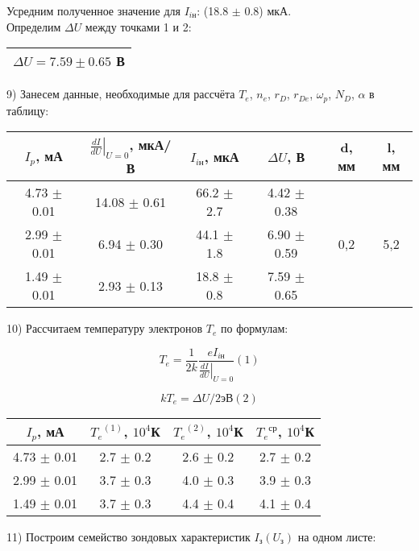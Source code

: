 \documentclass[a4paper,12pt]{article}
\begin{document}
Усредним полученное значение для $I_{i\text{н}}$: (18.8 $\pm$ 0.8) мкА. \\

Определим $\Delta U$ между точками 1 и 2: \begin{tabular}{|c|} \hline $\Delta U = 7.59 \pm 0.65$ В\\ \hline \end{tabular}

\par9) Занесем данные, необходимые для рассчёта $T_e$, $n_e$, $r_D$, $r_{De}$, ${\omega}_p$, $N_D$, $\alpha$ в таблицу:\\

\begin{center}
\begin{tabular}{|c|c|c|c|c|c|}
	\hline
	$I_p$, мА & $\left.\frac{dI}{dU}\right|_{U=0}$, мкА/В & $I_{i\text{н}}$, мкА & $\Delta U$, В & d, мм & l, мм\\
	\hline
	4.73 $\pm$ 0.01 & 14.08 $\pm$ 0.61 & 66.2 $\pm$ 2.7 & 4.42 $\pm$ 0.38  & \multirow{3}{*}{0,2} & \multirow{3}{*}{5,2}\\
	\cline{1-4}
	2.99 $\pm$ 0.01 & 6.94 $\pm$ 0.30 & 44.1 $\pm$ 1.8 & 6.90 $\pm$ 0.59 & & \\
	\cline{1-4}
	1.49 $\pm$ 0.01 & 2.93 $\pm$ 0.13 & 18.8 $\pm$ 0.8 & 7.59 $\pm$ 0.65 & & \\
	\hline
\end{tabular}
\end{center}

\par10) Рассчитаем температуру электронов $T_e$ по формулам: 

$$T_e = \frac{1}{2k}\frac{eI_{i\text{н}}}{\left.\frac{dI}{dU}\right|_{U=0}} (1)$$

$$kT_e = \Delta U/2 \text{эВ} (2)$$

\begin{center}
\begin{tabular}{|c|c|c|c|}
	\hline
	$I_p$, мА & ${T_e}^{(1)}$, $10^4$К & ${T_e}^{(2)}$, $10^4$К & ${T_e}^{\text{ср}}$, $10^4$К \\ 
	\hline
	4.73 $\pm$ 0.01 & 2.7 $\pm$ 0.2 & 2.6 $\pm$ 0.2 & 2.7 $\pm$ 0.2\\ 
	\hline
	2.99 $\pm$ 0.01 & 3.7 $\pm$ 0.3 & 4.0 $\pm$ 0.3 & 3.9 $\pm$ 0.3\\
	\hline
	1.49 $\pm$ 0.01 & 3.7 $\pm$ 0.3 & 4.4 $\pm$ 0.4 & 4.1 $\pm$ 0.4\\
	\hline
\end{tabular}
\end{center}

\par11) Построим семейство зондовых характеристик $I_{\text{з}}(U_{\text{з}})$ на одном листе:\\
\end{document}
